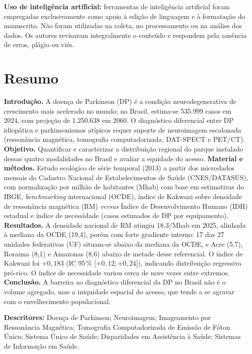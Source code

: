 \documentclass[12pt,a4paper,oneside]{article}
\begin{document}
\begin{singlespace}
\vspace{0.2cm}
\noindent\textbf{Uso de inteligência artificial:} ferramentas de
inteligência artificial foram empregadas exclusivamente como apoio à
edição de linguagem e à formatação do manuscrito. Não foram
utilizadas na coleta, no processamento ou na análise dos dados. Os
autores revisaram integralmente o conteúdo e respondem pela ausência
de erros, plágio ou viés.

\end{singlespace}

\newpage

\section*{Resumo}
\begin{singlespace}\small\noindent
\textbf{Introdução.} A doença de Parkinson (DP) é a condição
neurodegenerativa de crescimento mais acelerado no mundo; no Brasil,
estima-se 535.999 casos em 2024, com projeção de 1.250.638 em 2060.
O diagnóstico diferencial entre DP idiopática e parkinsonismos
atípicos requer suporte de neuroimagem escalonada (ressonância
magnética, tomografia computadorizada, DAT-SPECT e PET/CT).
\textbf{Objetivo.} Quantificar e caracterizar a distribuição
regional do parque instalado dessas quatro modalidades no Brasil e
avaliar a equidade do acesso. \textbf{Material e métodos.} Estudo
ecológico de série temporal (2013) a partir dos
microdados mensais do Cadastro Nacional de Estabelecimentos de Saúde
(CNES/DATASUS), com normalização por milhão de habitantes (Mhab) com
base em estimativas do IBGE, \textit{benchmarking} internacional
(OCDE), índice de Kakwani sobre densidade de ressonância magnética
(RM) \textit{versus} Índice de Desenvolvimento Humano (IDH) estadual
e índice de necessidade (casos estimados de DP por equipamento).
\textbf{Resultados.} A densidade nacional de RM atingiu 18,3/Mhab em
2025, alinhada à mediana da OCDE (19,4), porém com forte gradiente
interno: 17 das 27 unidades federativas (UF) situam-se abaixo da
mediana da OCDE, e Acre (5,7), Roraima (8,1) e Amazonas (8,6) abaixo
de metade desse referencial. O índice de Kakwani foi $+0{,}183$
(IC 95\,\% [$+0{,}12;+0{,}24$]), indicando distribuição regressiva
pró-rico. O índice de necessidade variou cerca de nove vezes entre
extremos. \textbf{Conclusão.} A barreira ao diagnóstico diferencial
da DP no Brasil não é o volume agregado, mas a iniquidade espacial do
acesso, que tende a se agravar com o envelhecimento populacional.

\vspace{0.35cm}\noindent\textbf{Descritores:} Doença de Parkinson;
Neuroimagem; Imageamento por Ressonância Magnética; Tomografia
Computadorizada de Emissão de Fóton Único; Sistema Único de Saúde;
Disparidades em Assistência à Saúde; Sistemas de Informação em Saúde.
\end{singlespace}
\end{document}
